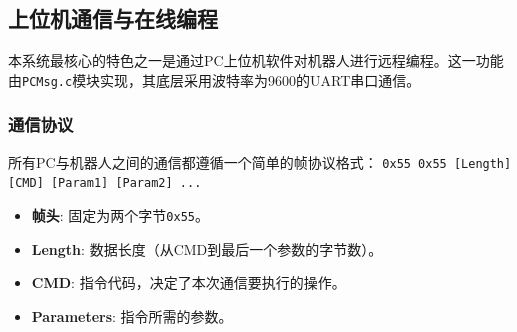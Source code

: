 \documentclass[a4paper,fontset=windows]{ctexart}
\providecommand{\tightlist}{%
  \setlength{\itemsep}{0pt}\setlength{\parskip}{0pt}}
\begin{document}
\subsection{上位机通信与在线编程}
本系统最核心的特色之一是通过PC上位机软件对机器人进行远程编程。这一功能由\texttt{PCMsg.c}模块实现，其底层采用波特率为9600的UART串口通信。
\subsubsection{通信协议}
所有PC与机器人之间的通信都遵循一个简单的帧协议格式：
\texttt{0x55 0x55 [Length] [CMD] [Param1] [Param2] ...}
\begin{itemize}
    \tightlist
    \item \textbf{帧头}: 固定为两个字节\texttt{0x55}。
    \item \textbf{Length}: 数据长度（从CMD到最后一个参数的字节数）。
    \item \textbf{CMD}: 指令代码，决定了本次通信要执行的操作。
    \item \textbf{Parameters}: 指令所需的参数。
\end{itemize}
\end{document}
